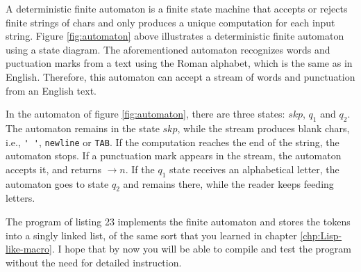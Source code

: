 \documentclass[
  12pt,
]{book}
\begin{document}
A deterministic finite automaton is a finite state machine that accepts
or rejects finite strings of chars and only produces a unique
computation for each input string. Figure \ref{fig:automaton} above
illustrates a deterministic finite automaton using a state diagram. The
aforementioned automaton recognizes words and puctuation marks from a
text using the Roman alphabet, which is the same as in English.
Therefore, this automaton can accept a stream of words and punctuation
from an English text.

In the automaton of figure \ref{fig:automaton}, there are three states:
\(skp\), \(q_1\) and \(q_2\). The automaton remains in the state
\(skp\), while the stream produces blank chars, i.e., \verb|' '|,
\texttt{newline} or \texttt{TAB}. If the computation reaches the end of
the string, the automaton stops. If a punctuation mark appears in the
stream, the automaton accepts it, and returns \(\rightarrow n\). If the
\(q_1\) state receives an alphabetical letter, the automaton goes to
state \(q_2\) and remains there, while the reader keeps feeding letters.

The program of listing 23 implements the finite automaton and stores the
tokens into a singly linked list, of the same sort that you learned in
chapter \ref{chp:Lisp-like-macro}. I hope that by now you will be able
to compile and test the program without the need for detailed
instruction.
\end{document}
